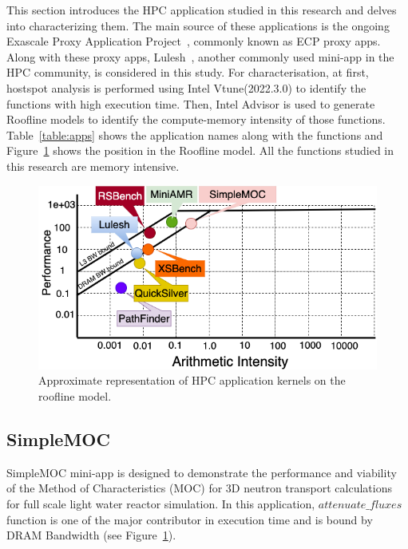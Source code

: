 
This section introduces the HPC application studied in this research and delves into characterizing them. The main source of these applications is the ongoing Exascale Proxy Application Project~\cite{ecpapp}, commonly known as ECP proxy apps. Along with these proxy apps, Lulesh~\cite{karlin2012lulesh}, another commonly used mini-app in the HPC community, is considered in this study. For characterisation, at first, hostspot analysis is performed using Intel Vtune(2022.3.0) to identify the functions with high execution time. Then, Intel Advisor is used to generate Roofline models to identify the compute-memory intensity of those functions. Table~\ref{table:apps} shows the application names along with the functions and Figure~\ref{fig:roofline} shows the position in the Roofline model. All the functions studied in this research are memory intensive.

\begin{figure}[t]%
\begin{center}
\includegraphics[width=1\linewidth]{MEMSYS22/figures/roofline/roofline_pim.png}
\end{center}
  \vspace{-0.1in}
\caption{Approximate representation of HPC application kernels on the roofline model.}
\label{fig:roofline}
\vspace{-0.2in}
\end{figure}



\subsection{SimpleMOC}
SimpleMOC mini-app is designed to demonstrate the performance and viability of the Method of Characteristics (MOC) for 3D neutron transport calculations for full scale
light water reactor simulation. In this application, $attenuate\_fluxes$ function is one of the major contributor in execution time and is bound by DRAM Bandwidth (see Figure~\ref{fig:roofline}). 


